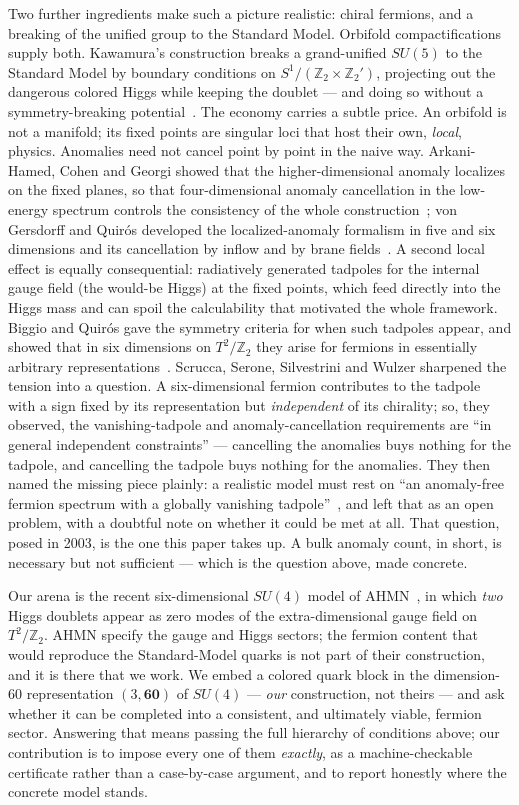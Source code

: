 \documentclass[11pt,a4paper]{article}
\begin{document}
Two further ingredients make such a picture realistic: chiral fermions, and a breaking
of the unified group to the Standard Model. Orbifold compactifications supply both.
Kawamura's construction breaks a grand-unified $SU(5)$ to the Standard Model by
boundary conditions on $S^1/(\mathbb{Z}_2\times\mathbb{Z}_2')$, projecting out the
dangerous colored Higgs while keeping the doublet --- and doing so without a
symmetry-breaking potential~\cite{KawamuraGUT}. The economy carries a subtle price.
An orbifold is not a manifold; its fixed points are singular loci that host their own,
\emph{local}, physics. Anomalies need not cancel point by point in the naive way.
Arkani-Hamed, Cohen and Georgi showed that the higher-dimensional anomaly localizes on
the fixed planes, so that four-dimensional anomaly cancellation in the low-energy
spectrum controls the consistency of the whole construction~\cite{ACG}; von Gersdorff
and Quir\'os developed the localized-anomaly formalism in five and six dimensions and
its cancellation by inflow and by brane fields~\cite{GdVQ,GdV6D}. A second local effect
is equally consequential: radiatively generated tadpoles for the internal gauge field
(the would-be Higgs) at the fixed points, which feed directly into the Higgs mass and
can spoil the calculability that motivated the whole framework. Biggio and Quir\'os
gave the symmetry criteria for when such tadpoles appear, and showed that in six
dimensions on $T^2/\mathbb{Z}_2$ they arise for fermions in essentially arbitrary
representations~\cite{BiggioQ}. Scrucca, Serone, Silvestrini and Wulzer sharpened the
tension into a question. A six-dimensional fermion contributes to the tadpole with a sign
fixed by its representation but \emph{independent} of its chirality; so, they observed,
the vanishing-tadpole and anomaly-cancellation requirements are ``in general independent
constraints'' --- cancelling the anomalies buys nothing for the tadpole, and cancelling
the tadpole buys nothing for the anomalies. They then named the missing piece plainly: a
realistic model must rest on ``an anomaly-free fermion spectrum with a globally vanishing
tadpole''~\cite{SSSW}, and left that as an open problem, with a doubtful note on whether
it could be met at all. That question, posed in 2003, is the one this paper takes up. A
bulk anomaly count, in short, is necessary but not sufficient --- which is the question
above, made concrete.

Our arena is the recent six-dimensional $SU(4)$ model of AHMN~\cite{AHMN}, in which
\emph{two} Higgs doublets appear as zero modes of the extra-dimensional gauge field on
$T^2/\mathbb{Z}_2$. AHMN specify the gauge and Higgs sectors; the fermion content that
would reproduce the Standard-Model quarks is not part of their construction, and it is
there that we work. We embed a colored quark block in the dimension-$60$ representation
$(3,\mathbf{60})$ of $SU(4)$ --- \emph{our} construction, not theirs --- and ask
whether it can be completed into a consistent, and ultimately viable, fermion sector.
Answering that means passing the full hierarchy of conditions above; our contribution
is to impose every one of them \emph{exactly}, as a machine-checkable certificate
rather than a case-by-case argument, and to report honestly where the concrete model
stands.
\end{document}
